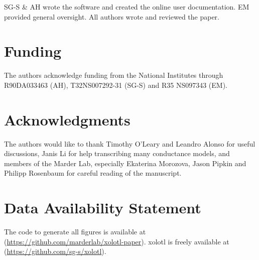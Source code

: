 \documentclass{frontiersSCNS} %
\begin{document}
SG-S \& AH wrote the software and created the online user documentation. EM provided general oversight. All authors wrote and reviewed the paper.

\section*{Funding}

The authors acknowledge funding from the National Institutes through R90DA033463 (AH), T32NS007292-31 (SG-S) and R35 NS097343 (EM).


\section*{Acknowledgments}
The authors would like to thank Timothy O'Leary and Leandro Alonso for useful discussions, Janis Li for help transcribing many conductance models, and members of the Marder Lab, especially Ekaterina Morozova, Jason Pipkin and Philipp Rosenbaum for careful reading of the manuscript. 

\section*{Data Availability Statement}

The code to generate all figures is available at (\url{https://github.com/marderlab/xolotl-paper}). xolotl is freely available at (\url{https://github.com/sg-s/xolotl}).

%
%
%
%
%
%

\printbibliography

%
%
%
%
%
%


\end{document}
